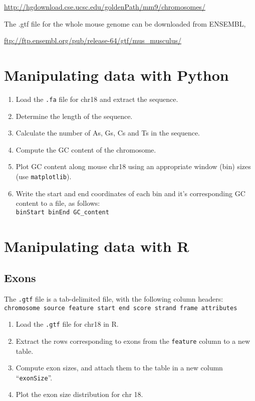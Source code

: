 \documentclass[a4paper,11pt]{article}
\begin{document}
\url{http://hgdownload.cse.ucsc.edu/goldenPath/mm9/chromosomes/}

The .gtf file for the whole mouse genome can be downloaded from ENSEMBL,

\url{ftp://ftp.ensembl.org/pub/release-64/gtf/mus_musculus/}



\section{Manipulating data with Python}
\begin{enumerate}
\item Load the \texttt{.fa} file for chr18 and extract the sequence.
\item Determine the length of the sequence.
\item Calculate the number of As, Gs, Cs and Ts in the sequence.
\item Compute the GC content of the chromosome.
\item Plot GC content along mouse chr18 using an appropriate window (bin) sizes (use \texttt{matplotlib}).
\item Write the start and end coordinates of each bin and it's corresponding GC content to a file, as follows: \\
\texttt {binStart binEnd GC\_content}
\end{enumerate}



\section{Manipulating data with R}
\subsection{Exons}
The \texttt{.gtf} file is a tab-delimited file, with the following column headers: \\
\texttt {chromosome source feature start end score strand frame attributes}
\begin{enumerate}
\item Load the \texttt{.gtf} file for chr18 in R.
\item Extract the rows corresponding to exons from the \texttt{feature} column to a new table.
\item Compute exon sizes, and attach them to the table in a new column ``\texttt{exonSize}''.
\item Plot the exon size distribution for chr 18.
\end{enumerate}
\end{document}
